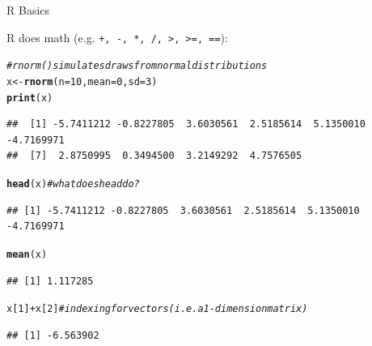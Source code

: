 \documentclass[svgnames,smaller]{beamer}\usepackage[]{graphicx}\usepackage[]{color}
\makeatletter
\newcommand{\hlnum}[1]{\textcolor[rgb]{0.686,0.059,0.569}{#1}}%
\newcommand{\hlcom}[1]{\textcolor[rgb]{0.678,0.584,0.686}{\textit{#1}}}%
\newcommand{\hlopt}[1]{\textcolor[rgb]{0,0,0}{#1}}%
\newcommand{\hlstd}[1]{\textcolor[rgb]{0.345,0.345,0.345}{#1}}%
\newcommand{\hlkwb}[1]{\textcolor[rgb]{0.69,0.353,0.396}{#1}}%
\newcommand{\hlkwc}[1]{\textcolor[rgb]{0.333,0.667,0.333}{#1}}%
\newcommand{\hlkwd}[1]{\textcolor[rgb]{0.737,0.353,0.396}{\textbf{#1}}}%
\newenvironment{kframe}{%
 \def\at@end@of@kframe{}%
 \ifinner\ifhmode%
  \def\at@end@of@kframe{\end{minipage}}%
  \begin{minipage}{\columnwidth}%
 \fi\fi%
 \def\FrameCommand##1{\hskip\@totalleftmargin \hskip-\fboxsep
 \colorbox{shadecolor}{##1}\hskip-\fboxsep
     \hskip-\linewidth \hskip-\@totalleftmargin \hskip\columnwidth}%
 \MakeFramed {\advance\hsize-\width
   \@totalleftmargin\z@ \linewidth\hsize
   \@setminipage}}%
 {\par\unskip\endMakeFramed%
 \at@end@of@kframe}
\newenvironment{knitrout}{}{} %
\makeatother
\begin{document}
\begin{frame}[fragile]{R Basics}

R does math (e.g. \texttt{+, -,  *, /, >, >=, ==}):

\begin{knitrout}\scriptsize
{}\color{fgcolor}\begin{kframe}
\begin{alltt}
\hlcom{# rnorm() simulates draws from normal distributions}
\hlstd{x} \hlkwb{<-} \hlkwd{rnorm}\hlstd{(}\hlkwc{n} \hlstd{=} \hlnum{10}\hlstd{,} \hlkwc{mean} \hlstd{=} \hlnum{0}\hlstd{,} \hlkwc{sd} \hlstd{=} \hlnum{3}\hlstd{)}
\hlkwd{print}\hlstd{(x)}
\end{alltt}
\begin{verbatim}
##  [1] -5.7411212 -0.8227805  3.6030561  2.5185614  5.1350010 -4.7169971
##  [7]  2.8750995  0.3494500  3.2149292  4.7576505
\end{verbatim}
\begin{alltt}
\hlkwd{head}\hlstd{(x)} \hlcom{# what does head do? }
\end{alltt}
\begin{verbatim}
## [1] -5.7411212 -0.8227805  3.6030561  2.5185614  5.1350010 -4.7169971
\end{verbatim}
\begin{alltt}
\hlkwd{mean}\hlstd{(x)}
\end{alltt}
\begin{verbatim}
## [1] 1.117285
\end{verbatim}
\begin{alltt}
\hlstd{x[}\hlnum{1}\hlstd{]} \hlopt{+} \hlstd{x[}\hlnum{2}\hlstd{]} \hlcom{# indexing for vectors (i.e. a 1-dimension matrix)}
\end{alltt}
\begin{verbatim}
## [1] -6.563902
\end{verbatim}
\end{kframe}
\end{knitrout}

\end{frame}


\end{document}
